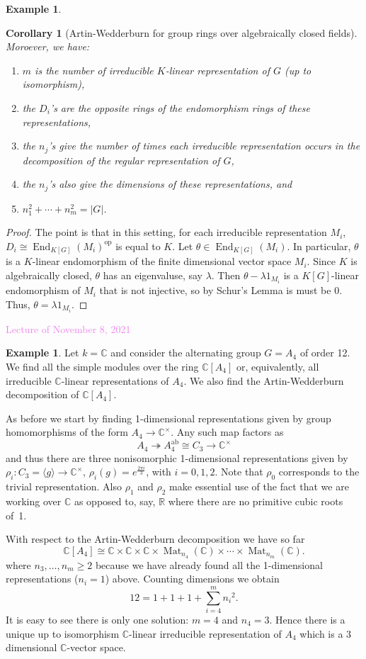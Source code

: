\documentclass{amsart}[12pt]
\def\End{\operatorname{End}}
\def\Mat{\operatorname{Mat}}
\newcommand{\onto}{\twoheadrightarrow}
\newcommand{\Nov}[1]{\textcolor{violet}{Lecture of November #1, 2021}}
\newcommand{\R}{{\mathbb{R}}}
\newcommand{\C}{\mathbb{C}}
\newcommand{\op}{\mathrm{op}}
\numberwithin{equation}{section}
\theoremstyle{plain} %
\newtheorem{cor}[equation]{Corollary}
\theoremstyle{definition}
\newtheorem{ex}[equation]{Example}
\theoremstyle{remark}
\begin{document}
\begin{ex}
\begin{cor}[Artin-Wedderburn for group rings over algebraically closed fields]
Moroever, we have:
\begin{enumerate}
\item $m$ is the number of irreducible $K$-linear representation of $G$ (up to isomorphism),
\item the $D_i$'s are the opposite rings of the endomorphism rings of these representations,
\item  the $n_j$'s give the number of times each irreducible representation occurs in the decomposition of the regular representation of $G$,
\item the $n_j$'s also give the dimensions of these representations, and
\item $n_1^2  + \cdots + n_m^2 = |G|$.
\end{enumerate}
\end{cor}
\begin{proof} The point is that in this setting, for each irreducible representation $M_i$, $D_i \cong \End_{K[G]}(M_i)^{\op}$ is equal to $K$. Let $\theta\in \End_{K[G]}(M_i)$. In particular, $\theta$ is a $K$-linear endomorphism of the finite dimensional vector space $M_i$. Since $K$ is algebraically closed, $\theta$ has an eigenvaluse, say $\lambda$. Then $\theta-\lambda 1_{M_i}$ is a $K[G]$-linear endomorphism of $M_i$ that is not injective, so by Schur's Lemma is must be $0$. Thus, $\theta = \lambda 1_{M_i}$.
\end{proof}

\Nov{8}

\begin{ex} Let $k = \C$ and consider the alternating group $G = A_4$ of order 12. We find all the simple modules over the ring $\C[A_4]$ or, equivalently, all irreducible $\C$-linear representations of $A_4$. We also find the Artin-Wedderburn decomposition of $\C[A_4]$.

As before we start by finding 1-dimensional representations given by group homomorphisms of the form $A_4 \to \C^\times$. Any such map factors as
  $$
A_4 \onto A_4^{\mathrm{ab}}\cong C_3 \to \C^\times
  $$
and thus there are three nonisomorphic 1-dimensional representations given by $\rho_i:C_3=\langle g\rangle \to \C^\times$, $\rho_i(g)=e^\frac{2\pi i}{3}$, with $i=0,1,2$. Note that $\rho_0$ corresponds to the trivial representation. Also $\rho_1$ and $\rho_2$ make essential use of the fact that we are working over $\C$ as opposed to, say, $\R$ where there are no primitive cubic roots of~1.

With respect to the Artin-Wedderburn decomposition we have so far
$$
\C[A_4] \cong \C \times \C \times \C  \times \Mat_{n_4}(\C)\times \cdots \times \Mat_{n_m}(\C).
$$
where $n_3, \ldots, n_m\geq 2$ because we have already found all the 1-dimensional representations ($n_i=1$) above. Counting dimensions we obtain
$$
12= 1+ 1 + 1 +\sum_{i=4}^m {n_i}^2.
$$
It is easy to see there is only one solution: $m=4$ and $n_4=3$.  Hence there is a unique up to isomorphism $\C$-linear irreducible representation of $A_4$ which is a 3 dimensional $\C$-vector space.


\end{ex}
\end{ex}
\end{document}
